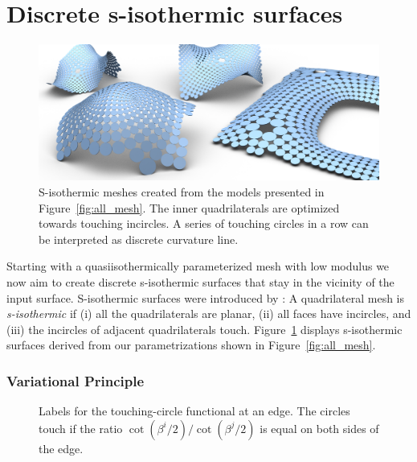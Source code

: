 \documentclass[Thesis.tex]{subfiles}
\begin{document}
\section{Discrete s-isothermic surfaces}
\label{sec:s-isothermic}

\begin{figure}
\centering
\includegraphics[width=\linewidth]{image/aag2012/all_circles.pdf}
\caption[S-isothermic meshes]{S-isothermic meshes created from the models presented in
Figure~\ref{fig:all_mesh}.
The inner quadrilaterals are optimized towards touching incircles. A series of
touching circles in a row can be interpreted as discrete curvature line.}
\label{fig:s_isothermic}
\end{figure}

Starting with a quasiisothermically parameterized mesh with low modulus 
we now aim to create discrete s-isothermic surfaces that
stay in the vicinity of the input surface. S-isothermic surfaces were
introduced by \cite{BobenkoP1996}: A quadrilateral mesh
is \mbox{\emph{s-isothermic}} if (i) all the quadrilaterals are planar, (ii)
all faces have incircles, and (iii) the incircles of adjacent quadrilaterals
touch.
Figure~\ref{fig:s_isothermic} displays s-isothermic surfaces derived from our
parametrizations shown in Figure~\ref{fig:all_mesh}.

\subsubsection{Variational Principle}

\begin{figure}
\centering
\resizebox{0.4\textwidth}{!}{}
\caption{Labels for the touching-circle
functional at an edge. The circles touch 
if the ratio $\cot\left(\beta^i/2\right)/\cot\left(\beta^j/2\right)$ is equal on both sides of the edge.}
\label{fig:functional}
\end{figure}
\end{document}
